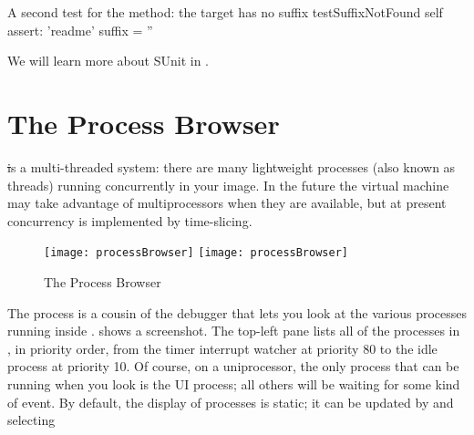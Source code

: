 \documentclass[a4paper,10pt,twoside]{book}
\begin{document}
\begin{method}[testNoSuffix]{A second test for the  method: the target has no suffix}
testSuffixNotFound
	self assert: 'readme' suffix = ''
\end{method}


We will learn more about SUnit in .


\section{The Process Browser}

\st is a multi-threaded system: there are many lightweight processes (also known as threads) running concurrently in your image. 
In the future the \pharo virtual machine may take advantage of multiprocessors when they are available, but at present concurrency is implemented by time-slicing.

\begin{figure}[btp]
	\begin{center}
	\ifluluelse
		{\texttt{[image: processBrowser]}}
		{\texttt{[image: processBrowser]}}
	\end{center}
	\caption{The Process Browser}
\end{figure}

The process  is a cousin of the debugger that lets you look at the various processes running inside \pharo.
 shows a screenshot.
The top-left pane lists all of the processes in \pharo, in priority order, from the timer interrupt watcher at priority 80 to the idle process at priority 10.
Of course, on a uniprocessor, the only process that can be running when you look is the UI process; all others will be waiting for some kind of event.
By default, the display of processes is static; it can be updated by  and selecting 
\end{document}
